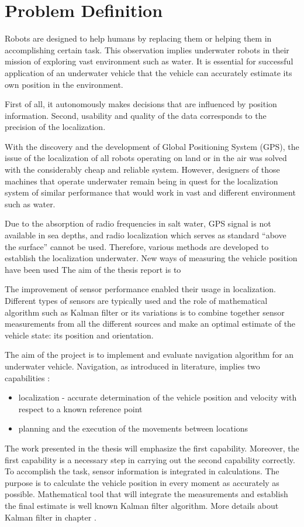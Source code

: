 \chapter{Problem Definition} \label{chap:problem-def}

Robots are designed to help humans by replacing them or helping them in accomplishing certain task. This observation implies underwater robots in their mission of exploring vast environment such as water. It is essential for successful application of an underwater vehicle that the vehicle can accurately estimate its own position in the environment.  

First of all, it autonomously makes decisions that are influenced by position information. Second, usability and quality of the data corresponds to the precision of the localization.

With the discovery and the development of Global Positioning System (GPS), the issue of the localization of all robots operating on land or in the air was solved with the considerably cheap and reliable system. However, designers of those machines that operate underwater remain being in quest for the localization system of similar performance that would work in vast and different environment such as water.

Due to the absorption of radio frequencies in salt water, GPS signal is not available in sea depths, and radio localization which serves as standard ``above the surface'' cannot be used. Therefore, various methods are developed to establish the localization underwater. New ways of measuring the vehicle position have been used  The aim of the thesis report is to  

The improvement of sensor performance enabled their usage in localization. Different types of sensors are typically used and the role of mathematical algorithm such as Kalman filter or its variations is to combine together sensor measurements from all the different sources and make an optimal estimate of the vehicle state: its position and orientation. 

The aim of the project is to implement and evaluate navigation algorithm for an underwater vehicle. Navigation, as introduced in literature, implies two capabilities \cite{farrell98}:
\begin{itemize}
\item localization - accurate determination of the vehicle position and velocity with respect to a known reference point
\item planning and the execution of the movements between locations   
\end{itemize} 
The work presented in the thesis will emphasize the first capability. Moreover, the first capability is a necessary step in carrying out the second capability correctly. To accomplish the task, sensor information is integrated in calculations. The purpose is to calculate the vehicle position in every moment as accurately as possible. Mathematical tool that will integrate the measurements and establish the final estimate is well known Kalman filter \cite{} algorithm. More details about Kalman filter in chapter \label{chap:KalmanFilter}. 

